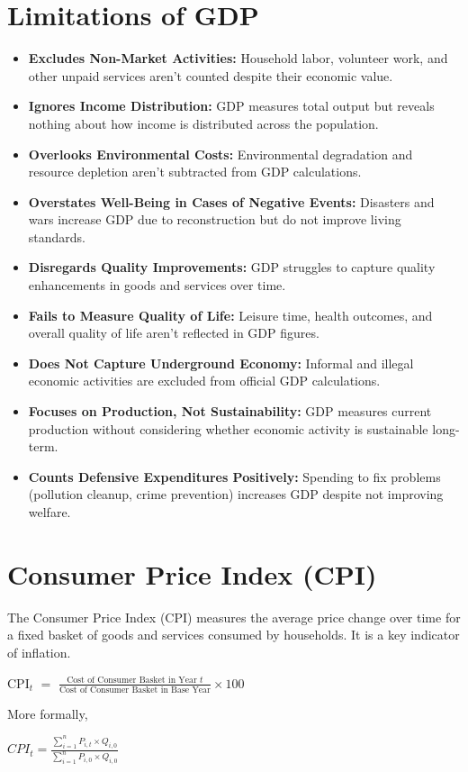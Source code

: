 \documentclass[a4paper, 11pt]{article}
\begin{document}
\section{Limitations of GDP}
\begin{itemize}
    \item \textbf{Excludes Non-Market Activities:} Household labor, volunteer work, and other unpaid services aren't counted despite their economic value.
    \item \textbf{Ignores Income Distribution:} GDP measures total output but reveals nothing about how income is distributed across the population.
    \item \textbf{Overlooks Environmental Costs:} Environmental degradation and resource depletion aren't subtracted from GDP calculations.
    \item \textbf{Overstates Well-Being in Cases of Negative Events:} Disasters and wars increase GDP due to reconstruction but do not improve living standards.
    \item \textbf{Disregards Quality Improvements:} GDP struggles to capture quality enhancements in goods and services over time.
    \item \textbf{Fails to Measure Quality of Life:} Leisure time, health outcomes, and overall quality of life aren't reflected in GDP figures.
    \item \textbf{Does Not Capture Underground Economy:} Informal and illegal economic activities are excluded from official GDP calculations.
    \item \textbf{Focuses on Production, Not Sustainability:} GDP measures current production without considering whether economic activity is sustainable long-term.
    \item \textbf{Counts Defensive Expenditures Positively:} Spending to fix problems (pollution cleanup, crime prevention) increases GDP despite not improving welfare.
\end{itemize}

\section{Consumer Price Index (CPI)}
The Consumer Price Index (CPI) measures the average price change over time for a fixed basket of goods and services consumed by households. It is a key indicator of inflation.
\begin{center}
    CPI$_t$ $=$ $\frac{\text{Cost of Consumer Basket in Year } t}{\text{Cost of Consumer Basket in Base Year}} \times 100$
\end{center}
More formally,
\begin{center}
    $CPI_t = \frac{\sum_{i=1}^n P_{i,t} \times Q_{i,0}}{\sum_{i=1}^n P_{i,0} \times Q_{i,0}}$
\end{center}
\end{document}

